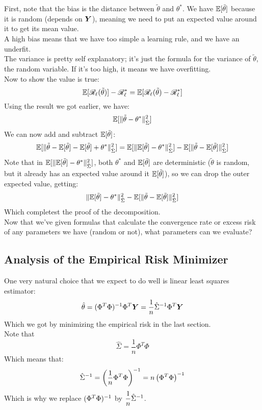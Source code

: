 \documentclass[12pt]{article}
\begin{document}
First, note that the bias is the 
distance between $\tilde{\theta}$
and $\theta^*$.
We have $\mathbb{E}[\tilde{\theta}]$
because it is random (depends on $\boldsymbol{Y}$),
meaning we need to put an expected value
around it to get its mean value. \\
A high bias means that we have too simple a
learning rule, and we have an underfit.\\

The variance is pretty self explanatory;
it's just the formula for the variance
of $\tilde{\theta}$, the random variable.
If it's too high, it means we have overfitting. \\

Now to show the value is true:
\[ \mathbb{E}[\mathscr{R}_{\ell}(\tilde{\theta})] 
- \mathscr{R}_{\ell}^*
= \mathbb{E}[\mathscr{R}_{\ell}(\tilde{\theta}) - \mathscr{R}_{\ell}^*] \]
Using the result we got earlier, we have:
\[ \mathbb{E}[\|\tilde{\theta} - \theta^* \|_{\hat{\Sigma}}^2] \]
We can now add and subtract $\mathbb{E}[\tilde{\theta}]$:
\[\mathbb{E}[\|\tilde{\theta} - \mathbb{E}[\tilde{\theta}]
- \mathbb{E}[\tilde{\theta}] + \theta^* \|_{\hat{\Sigma}}^2]
= \mathbb{E}[\|\mathbb{E}[\tilde{\theta}] - \theta^* \|_{\hat{\Sigma}}^2]
-\mathbb{E}[\|\tilde{\theta} - \mathbb{E}[\tilde{\theta}] \|_{\hat{\Sigma}}^2] \]
Note that in $\mathbb{E}[\|\mathbb{E}[\tilde{\theta}] 
- \theta^* \|_{\hat{\Sigma}}^2]$,
both $\theta^*$ and $\mathbb{E}[\tilde{\theta}]$
are deterministic ($\tilde{\theta}$ is random,
but it already has an expected value around it
$\mathbb{E}[\tilde{\theta}]$),
so we can drop the outer expected value, getting:
\[ \|\mathbb{E}[\tilde{\theta}] - \theta^* \|_{\hat{\Sigma}}^2
-\mathbb{E}[\|\tilde{\theta} - \mathbb{E}[\tilde{\theta}] \|_{\hat{\Sigma}}^2 ] \]
Which completest the proof of the decomposition. \\

Now that we've given formulas that calculate
the convergence rate or excess risk
of any parameters we have (random or not),
what parameters can we evaluate? \\

\newpage

\subsection*{Analysis of the Empirical Risk Minimizer}

One very natural choice that we expect
to do well is linear least squares
estimator:
\[ \hat{\theta} = (\Phi^T\Phi)^{-1}\Phi^T\boldsymbol{Y}
= \dfrac{1}{n}\hat{\Sigma}^{-1} \Phi^T\boldsymbol{Y} \]
Which we got by minimizing the empirical risk
in the last section. \\
Note that
\[ \hat{\Sigma} = \dfrac{1}{n}\Phi^T\Phi \]
Which means that:
\[ {\hat{\Sigma}}^{-1} 
= \left( \dfrac{1}{n}\Phi^T\Phi \right)^{-1}
= n\left( \Phi^T\Phi \right)^{-1} \]
Which is why we replace $(\Phi^T\Phi)^{-1}$
by $\dfrac{1}{n}\hat{\Sigma}^{-1}$. \\
\end{document}
